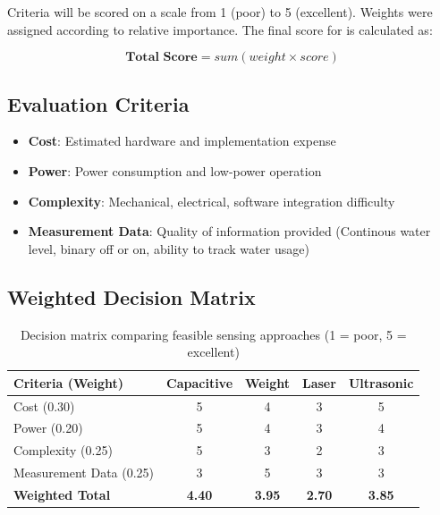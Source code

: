 \documentclass[12pt]{article}
\begin{document}
Criteria will be scored on a scale from 1 (poor) to 5 (excellent). Weights were assigned according to relative importance. The final score for is calculated as:

\[
\textbf{Total Score} = sum(weight × score)
\]

\subsection{Evaluation Criteria}

\begin{itemize}
\item \textbf{Cost}: Estimated hardware and implementation expense
\item \textbf{Power}: Power consumption and low-power operation
\item \textbf{Complexity}: Mechanical, electrical, software integration difficulty
\item \textbf{Measurement Data}: Quality of information provided (Continous water level, binary off or on, ability to track water usage)
\end{itemize}

\subsection{Weighted Decision Matrix}

\begin{table}[h]
\centering
\begin{tabular}{lcccc}
\hline
\textbf{Criteria (Weight)} & \textbf{Capacitive} & \textbf{Weight} & \textbf{Laser} & \textbf{Ultrasonic} \\
\hline
Cost (0.30) & 5 & 4 & 3 & 5 \\
Power (0.20) & 5 & 4 & 3 & 4 \\
Complexity (0.25) & 5 & 3 & 2 & 3 \\
Measurement Data (0.25) & 3 & 5 & 3 & 3 \\
\hline
\textbf{Weighted Total} & \textbf{4.40} & \textbf{3.95} & \textbf{2.70} & \textbf{3.85} \\
\hline
\end{tabular}
\caption{Decision matrix comparing feasible sensing approaches (1 = poor, 5 = excellent)}
\end{table}
\end{document}
